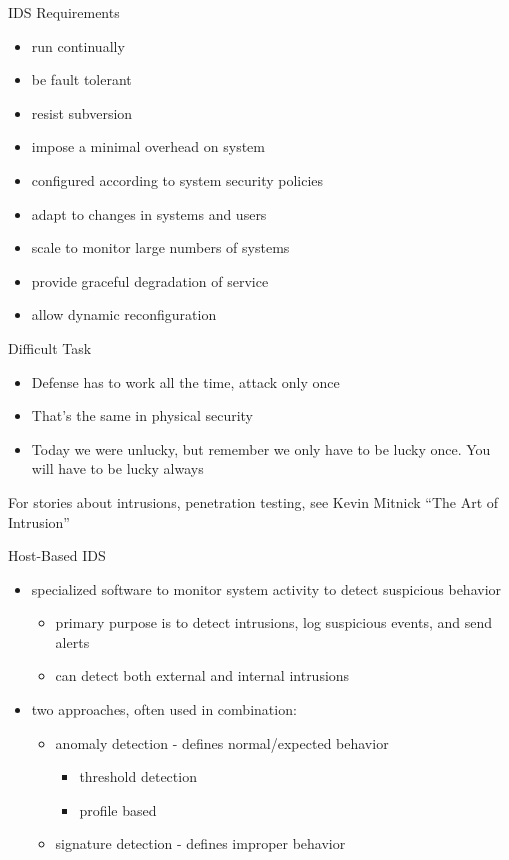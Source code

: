 \documentclass{beamer}
\begin{document}
\begin{frame}{IDS Requirements}
  \begin{itemize}
  \item run continually 
  \item be fault tolerant 
  \item resist subversion 
  \item impose a minimal overhead on system 
  \item configured according to system security policies 
  \item adapt to changes in systems and users 
  \item scale to monitor large numbers of systems 
  \item provide graceful degradation of service 
  \item allow dynamic reconfiguration 
  \end{itemize}
\end{frame}

\begin{frame}{Difficult Task}
  \begin{itemize}
  \item Defense has to work all the time, attack only 
    once
  \item That's the same in physical security
  \item Today we were unlucky,
    but remember we only have to be lucky once.
    You will have to be lucky always
  \end{itemize}
  For stories about intrusions, penetration testing, 
see Kevin Mitnick ``The Art of Intrusion''
\end{frame}

\begin{frame}{Host-Based IDS}
  \begin{itemize}
  \item specialized software to monitor system activity to 
    detect suspicious behavior 
    \begin{itemize}
    \item primary purpose is to detect intrusions, log suspicious events, 
      and send alerts 
    \item can detect both external and internal intrusions 
    \end{itemize}
  \item two approaches, often used in combination: 
    \begin{itemize}
    \item anomaly detection - defines normal/expected behavior 
      \begin{itemize}
      \item threshold detection 
      \item profile based 
      \end{itemize}
    \item signature detection - defines improper behavior
    \end{itemize}
  \end{itemize}
\end{frame}
\end{document}
